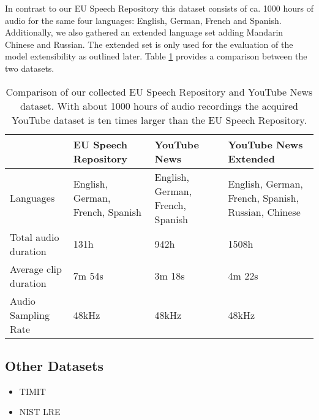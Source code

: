   	In contrast to our EU Speech Repository this dataset consists of ca. 1000 hours of audio  for the same four languages: English, German, French and Spanish. Additionally, we also gathered an extended language set adding Mandarin Chinese and Russian. The extended set is only used for the evaluation of the model extensibility as outlined later. Table \ref{tab:dataset_comparison} provides a comparison between the two datasets.
  	
  	
\begin{table}[]
\centering
\begin{tabularx}{\textwidth}{lXXX}
\toprule
               & EU Speech Repository & YouTube News & YouTube News \mbox{Extended} \\ 
\midrule
Languages             & English, German, French, Spanish & English, German, French, Spanish & English, German, French, Spanish, Russian, Chinese \\
Total audio duration  & 131h   & 942h   & 1508h   \\
Average clip duration & 7m 54s & 3m 18s & 4m 22s  \\
Audio Sampling Rate   & 48kHz  & 48kHz  & 48kHz   \\ 
\bottomrule
\end{tabularx}
\caption{Comparison of our collected EU Speech Repository and YouTube News dataset. With about 1000 hours of audio recordings the acquired YouTube dataset is ten times larger than the EU Speech Repository.}
\label{tab:dataset_comparison}
\end{table}

\subsection{Other Datasets}
\label{sec:other datasets}
\begin{itemize}
\item TIMIT	
\item NIST LRE 
\end{itemize}




